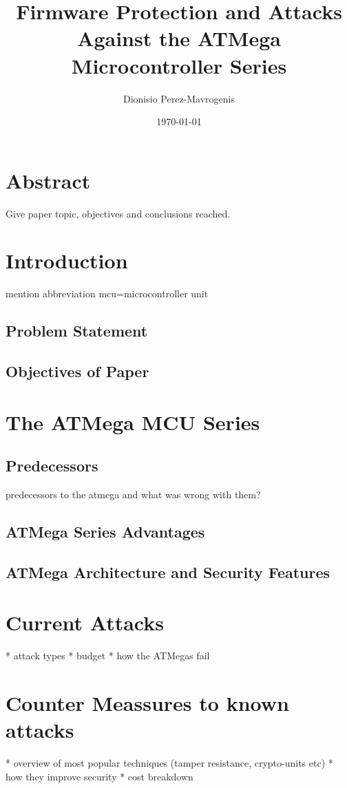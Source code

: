 \documentclass[12pt,a4paper,twocolumn]{article}
\author{Dionisio Perez-Mavrogenis}
\title{Firmware Protection and Attacks Against the ATMega Microcontroller Series}
\date{\today}
\begin{document}
	\maketitle
	
	\section*{Abstract}
	Give paper topic, objectives and conclusions reached.
	
	\section{Introduction}
	mention abbreviation mcu=microcontroller unit
	\subsection{Problem Statement}

	\subsection{Objectives of Paper}
	
	\section{The ATMega MCU Series}
	\subsection{Predecessors}
	predecessors to the atmega and what was wrong with them?
	\subsection{ATMega Series Advantages}
	\subsection{ATMega Architecture and Security Features}
	
	\section{Current Attacks}
	* attack types
	* budget
	* how the ATMegas fail

	\section{Counter Meassures to known attacks}
	* overview of most popular techniques (tamper resistance, crypto-units etc)
		* how they improve security		
		* cost breakdown
\end{document}
